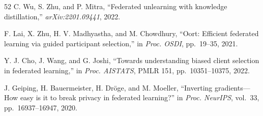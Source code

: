 \documentclass[conference]{IEEEtran}
\begin{document}
\begin{thebibliography}{52}
C. Wu, S. Zhu, and P. Mitra, ``Federated unlearning with knowledge distillation,'' \textit{arXiv:2201.09441}, 2022.

F. Lai, X. Zhu, H. V. Madhyastha, and M. Chowdhury, ``Oort: Efficient federated learning via guided participant selection,'' in \textit{Proc. OSDI}, pp.~19--35, 2021.

Y. J. Cho, J. Wang, and G. Joshi, ``Towards understanding biased client selection in federated learning,'' in \textit{Proc. AISTATS}, PMLR 151, pp.~10351--10375, 2022.


J. Geiping, H. Bauermeister, H. Dr\"oge, and M. Moeller, ``Inverting gradients---How easy is it to break privacy in federated learning?'' in \textit{Proc. NeurIPS}, vol.~33, pp.~16937--16947, 2020.

\end{thebibliography}
\end{document}
